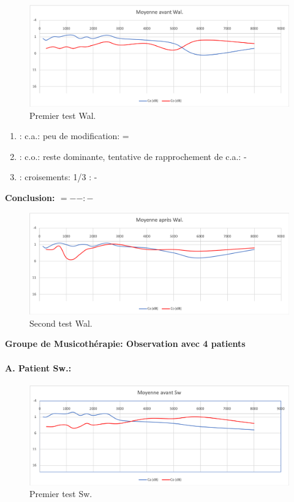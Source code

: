 \begin{figure}
\centering
\includegraphics[width=0.7\linewidth]{images/graphiques/wal_pre.png}
\caption[Moyenne OG+OD]{Premier test Wal.}
       
\label{groupecontroleimage1}
\end{figure}

	\begin{enumerate}
 		
 		\item : c.a.: peu de modification: =
                
 		\item : c.o.: reste dominante, tentative de rapprochement de c.a.: -
 		\item : croisements: 1/3 :  -
                  
                \end{enumerate}

                \textbf{ Conclusion:  $= -  -        : -$ }

               \begin{figure}
\centering
\includegraphics[width=0.7\linewidth]{images/graphiques/wal_post.png}
\caption[Moyenne OG+OD]{Second test Wal.}
       
\label{groupecontroleimage1}
\end{figure}
                
  \textbf{ Groupe de Musicothérapie: Observation avec 4 patients}

\paragraph{ A. Patient Sw.:}



 \begin{figure}
\centering
\includegraphics[width=0.7\linewidth]{images/graphiques/sw_pre.png}
\caption[Moyenne OG+OD]{Premier test Sw.}
       
\label{groupecontroleimage1}
\end{figure}

